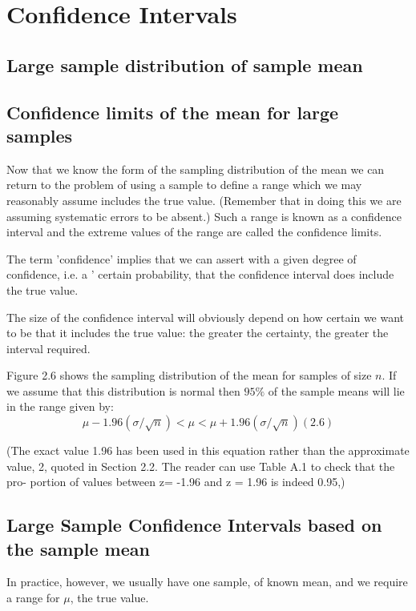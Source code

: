 \documentclass[a4paper,12pt]{article}
\begin{document}
	
	\tableofcontents
	\newpage
	
\section{Confidence Intervals}

\subsection{Large sample distribution of sample mean}

\subsection{Confidence limits of the mean for large samples}
Now that we know the form of the sampling distribution of the mean we can return to the problem of using a sample to define a range which we may reasonably assume includes the true value. (Remember that in doing this we are assuming systematic errors to be absent.) Such a range is known as a confidence interval and the extreme values of the range are called the confidence limits.

The term 'confidence' implies that we can assert with a given degree of confidence, i.e. a ' certain probability, that the confidence interval does include the true value.

The size of the confidence interval will obviously depend on how certain we want to be that it includes the true value: the greater the certainty, the greater the interval required.

Figure 2.6 shows the sampling distribution of the mean for samples of size $n$. If we assume that this distribution is normal then $95\%$  of the sample means will lie in the range given by:
\[ \mu - 1.96(\sigma/\sqrt{n}) < \mu < \mu + 1.96(\sigma/\sqrt{n}) (2.6)\]

(The exact value 1.96 has been used in this equation rather than the approximate
value, 2, quoted in Section 2.2. The reader can use Table A.1 to check that the pro-
portion of values between z= -1.96 and z = 1.96 is indeed 0.95,)

\subsection{Large Sample Confidence Intervals based on the sample mean}

In practice, however, we usually have one sample, of known mean, and we require a range for $\mu$, the true value.
\end{document}
